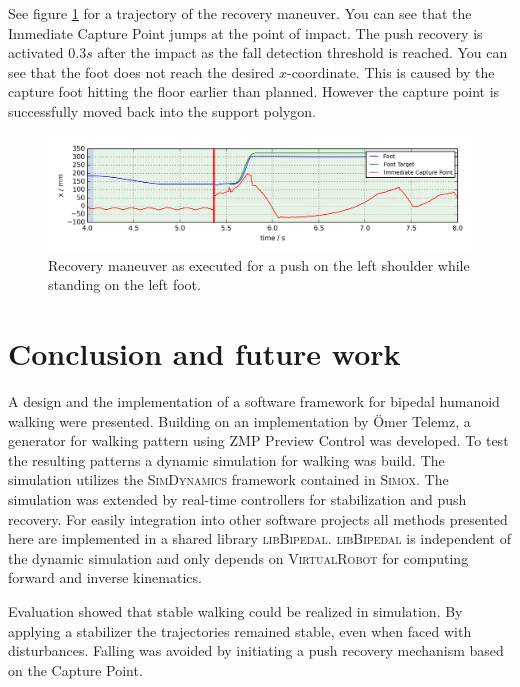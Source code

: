 \documentclass[english,ngerman]{KITreprt}
\newcommand{\name}[1]{\textsc{#1}}
\begin{document}
See figure \ref{img:push-recovery-x} for a trajectory of the recovery
maneuver. You can see that the Immediate Capture Point jumps at the
point of impact. The push recovery is activated $0.3s$ after the impact
as the fall detection threshold is reached. You can see that the foot
does not reach the desired $x$-coordinate. This is caused by the capture
foot hitting the floor earlier than planned. However the capture point
is successfully moved back into the support polygon.

\begin{figure}[hbt]
\vspace*{-1em}
\includegraphics[width=\textwidth,resolution=300]{images/push_recovery_x.png}
\caption{Recovery maneuver as executed for a push on the left shoulder while standing on the left foot.}
\label{img:push-recovery-x}
\end{figure}

\chapter{Conclusion and future work}\label{conclusion-and-future-work}

A design and the implementation of a software framework for bipedal
humanoid walking were presented. Building on an implementation by Ömer
Telemz, a generator for walking pattern using ZMP Preview Control was
developed. To test the resulting patterns a dynamic simulation for
walking was build. The simulation utilizes the \name{SimDynamics}
framework contained in \name{Simox}. The simulation was extended by
real-time controllers for stabilization and push recovery. For easily
integration into other software projects all methods presented here are
implemented in a shared library \name{libBipedal}. \name{libBipedal} is
independent of the dynamic simulation and only depends on
\name{VirtualRobot} for computing forward and inverse kinematics.

Evaluation showed that stable walking could be realized in simulation.
By applying a stabilizer the trajectories remained stable, even when
faced with disturbances. Falling was avoided by initiating a push
recovery mechanism based on the Capture Point.
\end{document}
